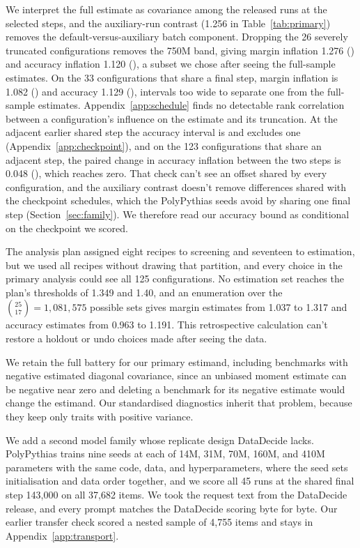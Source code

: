We interpret the full estimate as covariance among the released runs at the selected steps, and the auxiliary-run contrast (1.256 in Table~\ref{tab:primary}) removes the default-versus-auxiliary batch component. Dropping the 26 severely truncated configurations removes the 750M band, giving margin inflation 1.276 () and accuracy inflation 1.120 (), a subset we chose after seeing the full-sample estimates. On the 33 configurations that share a final step, margin inflation is 1.082 () and accuracy 1.129 (), intervals too wide to separate one from the full-sample estimates. Appendix~\ref{app:schedule} finds no detectable rank correlation between a configuration's influence on the estimate and its truncation. At the adjacent earlier shared step the accuracy interval is  and excludes one (Appendix~\ref{app:checkpoint}), and on the 123 configurations that share an adjacent step, the paired change in accuracy inflation between the two steps is 0.048 (), which reaches zero. That check can't see an offset shared by every configuration, and the auxiliary contrast doesn't remove differences shared with the checkpoint schedules, which the PolyPythias seeds avoid by sharing one final step (Section~\ref{sec:family}). We therefore read our accuracy bound as conditional on the checkpoint we scored.

The analysis plan assigned eight recipes to screening and seventeen to estimation, but we used all recipes without drawing that partition, and every choice in the primary analysis could see all 125 configurations. No estimation set reaches the plan's thresholds of 1.349 and 1.40, and an enumeration over the $\binom{25}{17}=1{,}081{,}575$ possible sets gives margin estimates from 1.037 to 1.317 and accuracy estimates from 0.963 to 1.191. This retrospective calculation can't restore a holdout or undo choices made after seeing the data.

We retain the full battery for our primary estimand, including benchmarks with negative estimated diagonal covariance, since an unbiased moment estimate can be negative near zero and deleting a benchmark for its negative estimate would change the estimand. Our standardised diagnostics inherit that problem, because they keep only traits with positive variance.

We add a second model family whose replicate design DataDecide lacks. PolyPythias \citep{vanderwal2025} trains nine seeds at each of 14M, 31M, 70M, 160M, and 410M parameters with the same code, data, and hyperparameters, where the seed sets initialisation and data order together, and we score all 45 runs at the shared final step 143,000 on all 37,682 items. We took the request text from the DataDecide release, and every prompt matches the DataDecide scoring byte for byte. Our earlier transfer check scored a nested sample of 4,755 items and stays in Appendix~\ref{app:transport}.


